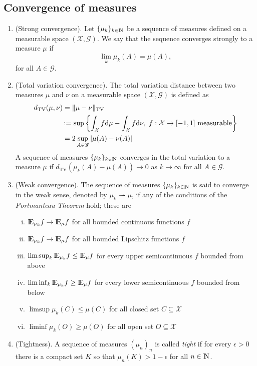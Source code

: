 \documentclass[a4paper,10pt]{article}
\begin{document}
\subsection{Convergence of measures}
\begin{enumerate}
 \item (Strong convergence). Let $\{\mu_k\}_{k\in\N}$ be a sequence of measures defined on a 
       measurable space $(\mathcal{X}, \mathscr{G})$. We say that the sequence converges strongly
       to a measure $\mu$ if
       \[
        \lim_k \mu_k(A) = \mu(A),
       \]
      for all $A\in\mathscr{G}$.
 \item (Total variation convergence). The total variation distance between two measures $\mu$ and 
       $\nu$ on a measurable space $(\mathcal{X}, \mathscr{G})$ is defined as
       \begin{align*}
        d_{\mathrm{TV}}(\mu,\nu) &= \|\mu-\nu\|_{\mathrm{TV}} \\
          &{}\mathop{\mathrel{:}=}{} \sup \left\{\int_{\mathcal{X}}f\mathrm{d}\mu - \int_{\mathcal{X}}f \mathrm{d} \nu,\ f:\mathcal{X}\to[-1,1] \text{ measurable} \right\}\\
          &=2\sup_{A\in\mathscr{G}}|\mu(A) - \nu(A)|
       \end{align*}
      A sequence of measures $\{\mu_k\}_{k\in\N}$ converges in the total variation
      to a measure $\mu$ if $d_{\mathrm{TV}}(\mu_k(A)-\mu(A))\to 0$ as $k\to\infty$
      for all $A\in\mathscr{G}$.
 \item (Weak convergence). The sequence of measures $\{\mu_k\}_{k\in\N}$ is said to converge 
       in the weak sense, denoted by $\mu_k \rightharpoonup \mu$, if any of the conditions 
       of the \textit{Portmanteau Theorem} hold; these are
       \begin{enumerate}[i.]
        \item $\E_{\mu_k} f\to \E_{\mu} f$ for all bounded continuous functions $f$
        \item $\E_{\mu_k} f\to \E_{\mu} f$ for all bounded Lipschitz functions $f$
        \item $\limsup_k\E_{\mu_k} f \leq \E_{\mu} f$ for every upper semicontinuous $f$ bounded from above
        \item $\liminf_k\E_{\mu_k} f \geq \E_{\mu} f$ for every lower semicontinuous $f$ bounded from below
        \item $\limsup \mu_k(C) \leq \mu(C)$ for all closed set $C\subseteq \mathcal{X}$
        \item $\liminf \mu_k(O) \geq \mu(O)$ for all open set $O\subseteq \mathcal{X}$
       \end{enumerate}
 \item (Tightness). A sequence of measures $(\mu_n)_n$ is called \textit{tight} if for every $\epsilon>0$
       there is a compact set $K$ so that $\mu_n(K)>1-\epsilon$ for all $n\in\N$.
       

\end{enumerate}
\end{document}
